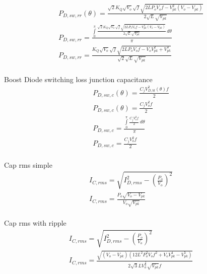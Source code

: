\documentclass[12pt]{report}
\begin{document}
\begin{align}
P_{D,sw,rr}(\theta) = \frac{\sqrt{2} K_{Q} \sqrt{V_{o}} \sqrt{f} \sqrt{2 L P_{o} V_{o} f - V_{pk}^{2} \left(V_{o} - V_{pk}\right)}}{2 \sqrt{L} \sqrt{V_{pk}}}\\
P_{D,sw,rr} = \frac{\int\limits_{0}^{\pi} \frac{\sqrt{2} K_{Q} \sqrt{V_{o}} \sqrt{f} \sqrt{2 L P_{o} V_{o} f - V_{pk}^{2} \left(V_{o} - V_{pk}\right)}}{2 \sqrt{L} \sqrt{V_{pk}}}\, d\theta}{\pi}\\
P_{D,sw,rr} = \frac{K_{Q} \sqrt{V_{o}} \sqrt{f} \sqrt{2 L P_{o} V_{o} f - V_{o} V_{pk}^{2} + V_{pk}^{3}}}{\sqrt{2} \sqrt{L} \sqrt{V_{pk}}}\\
\end{align}

Boost Diode switching loss junction capacitance
\begin{align}
P_{D,sw,c}(\theta) = \frac{C_{j}V_{D,bl}^{2}(\theta)f}{2}\\
P_{D,sw,c}(\theta) = \frac{C_{j} V_{o}^{2} f}{2}\\
P_{D,sw,c} = \frac{\int\limits_{0}^{\pi} \frac{C_{j} V_{o}^{2} f}{2}\, d\theta}{\pi}\\
P_{D,sw,c} = \frac{C_{j} V_{o}^{2} f}{2}\\
\end{align}

Cap rms simple
\begin{align}
I_{C,rms} = \sqrt{I_{D,rms}^2 - (\frac{P_o}{V_o})^2}\\
I_{C,rms} = \frac{P_{o} \sqrt{V_{o} - V_{pk}}}{V_{o} \sqrt{V_{pk}}}\\
\end{align}

Cap rms with ripple
\begin{align}
I_{C,rms} = \sqrt{I_{D,rms}^2 - (\frac{P_o}{V_o})^2}\\
I_{C,rms} = \frac{\sqrt{\left(V_{o} - V_{pk}\right) \left(12 L^{2} P_{o}^{2} V_{o} f^{2} + V_{o} V_{pk}^{4} - V_{pk}^{5}\right)}}{2 \sqrt{3} L V_{o}^{\frac{3}{2}} \sqrt{V_{pk}} f}\\
\end{align}
\end{document}
